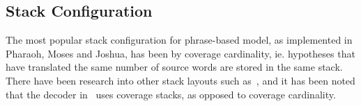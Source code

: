 \documentclass[11pt]{article}
\begin{document}

\subsection{Stack Configuration}

The most popular stack configuration for phrase-based model, as implemented in Pharaoh, Moses and Joshua, has been by coverage cardinality, ie. hypotheses that have translated the same number of source words are stored in the same stack. There have been research into other stack layouts such as~\cite{ortizmartinez-garciavarea-casacuberta:2006:WMT}, and it has been noted that the decoder in~\cite{Brown:1993} uses coverage stacks, as opposed to coverage cardinality. 
\end{document}
